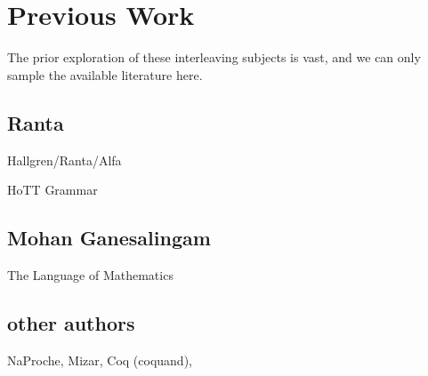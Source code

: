 \section{Previous Work}

The prior exploration of these interleaving subjects is vast, and we can only
sample the available literature here.  

\subsection{Ranta}

Hallgren/Ranta/Alfa

HoTT Grammar

\subsection{Mohan Ganesalingam}

The Language of Mathematics

\subsection{other authors}

NaProche, Mizar, Coq (coquand), 
